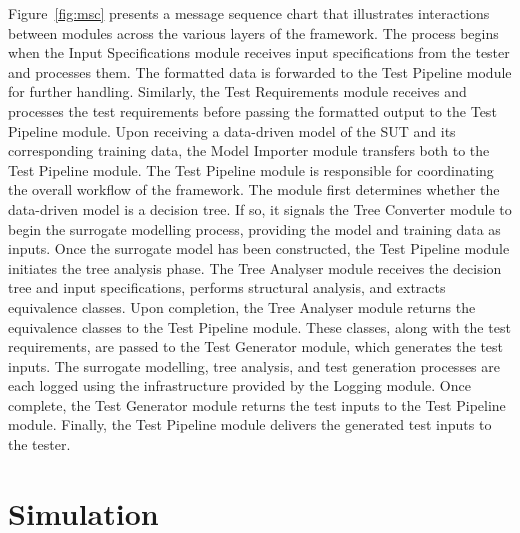 \documentclass[
]{ceurart}
\theoremstyle{definition}
\begin{document}
Figure~\ref{fig:msc} presents a message sequence chart that illustrates interactions between modules across the various layers of the framework. The process begins when the Input Specifications module receives input specifications from the tester and processes them. The formatted data is forwarded to the Test Pipeline module for further handling. Similarly, the Test Requirements module receives and processes the test requirements before passing the formatted output to the Test Pipeline module. Upon receiving a data-driven model of the SUT and its corresponding training data, the Model Importer module transfers both to the Test Pipeline module. The Test Pipeline module is responsible for coordinating the overall workflow of the framework. The module first determines whether the data-driven model is a decision tree. If so, it signals the Tree Converter module to begin the surrogate modelling process, providing the model and training data as inputs. Once the surrogate model has been constructed, the Test Pipeline module initiates the tree analysis phase. The Tree Analyser module receives the decision tree and input specifications, performs structural analysis, and extracts equivalence classes. Upon completion, the Tree Analyser module returns the equivalence classes to the Test Pipeline module. These classes, along with the test requirements, are passed to the Test Generator module, which generates the test inputs. The surrogate modelling, tree analysis, and test generation processes are each logged using the infrastructure provided by the Logging module. Once complete, the Test Generator module returns the test inputs to the Test Pipeline module. Finally, the Test Pipeline module delivers the generated test inputs to the tester.

\section{Simulation}
\label{sec:sim}
\end{document}
